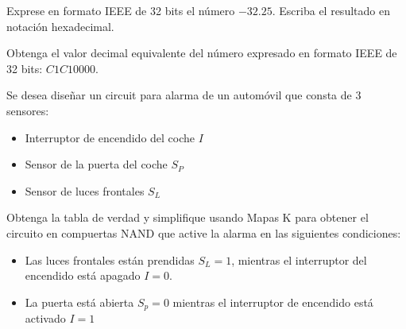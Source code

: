 \documentclass[addpoints]{exam}
\begin{document}
\begin{questions}



\question[2] Exprese en formato IEEE de 32 bits el número
$-32.25$. Escriba el resultado en notación hexadecimal. %



\question[2] Obtenga el valor decimal equivalente del número expresado en
formato  IEEE de 32 bits: $C1C10000$. %



\question[2] Se desea diseñar un circuit para alarma de un automóvil
que consta de 3 sensores:
\begin{itemize}
\item Interruptor de encendido del coche $I$
\item Sensor de la puerta del coche $S_P$
\item Sensor de luces frontales $S_L$
\end{itemize}
Obtenga la tabla de verdad y simplifique usando Mapas K para obtener
el circuito en compuertas NAND que active la alarma en las siguientes
condiciones:

\begin{itemize}
\item Las luces frontales están prendidas $S_L=1$, mientras el
  interruptor del encendido está apagado $I = 0$.
\item La puerta está abierta $S_p=0$ mientras el interruptor de
  encendido está activado $I=1$
\end{itemize}


\end{questions}
\end{document}
